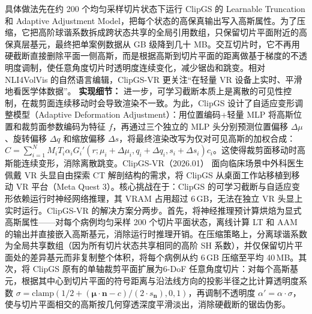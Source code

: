 具体做法先在约 200 个均匀采样切片状态下运行 ClipGS 的 Learnable Truncation 和 Adaptive Adjustment Model，把每个状态的高保真输出写入高斯属性。为了压缩，它把高阶球谐系数拆成跨状态共享的全局引用数组，只保留切片平面附近的高保真层基元，最终把单案例数据从 GB 级降到几十 MB。交互切片时，它不再用硬截断直接删除平面一侧高斯，而是根据高斯到切片平面的距离做基于梯度的不透明度调制，使任意角度切片时透明度连续变化，减少锯齿和跳变。相对 NLI4VolVis 的自然语言编辑，ClipGS-VR 更关注“在轻量 VR 设备上实时、平滑地看医学体数据”。
\textbf{实现细节：} 进一步，可学习截断本质上是离散的可见性控制，在裁剪面连续移动时会导致渲染不一致。为此，ClipGS 设计了自适应变形调整模型（Adaptive Deformation Adjustment）：用位置编码+轻量 MLP 将高斯位置和裁剪面参数编码为特征 $f$，再通过三个独立的 MLP 头分别预测位置偏移 $\Delta\mu$、旋转偏移 $\Delta q$ 和缩放偏移 $\Delta s$，将最终渲染改写为仅对可见高斯的加权合成：$C = \sum_{i=1}^{N} M_i T_i \alpha_i G_i'(r; \mu_i + \Delta\mu_i, q_i + \Delta q_i, s_i + \Delta s_i) c_i$。这使得裁剪面移动时高斯能连续变形，消除离散跳变。ClipGS-VR（2026.01） 面向临床场景中外科医生佩戴 VR 头显自由探索 CT 解剖结构的需求，将 ClipGS 从桌面工作站移植到移动 VR 平台（Meta Quest 3）。核心挑战在于：ClipGS 的可学习截断与自适应变形依赖运行时神经网络推理，其 VRAM 占用超过 6\,GB，无法在独立 VR 头显上实时运行。ClipGS-VR 的解决方案分两步。首先，将神经推理预计算烘焙为显式高斯属性——对每个病例均匀采样 200 个切片平面状态，离线计算 LT 和 AAM 的输出并直接嵌入高斯基元，消除运行时推理开销。在压缩策略上，分离球谐系数为全局共享数组（因为所有切片状态共享相同的高阶 SH 系数），并仅保留切片平面处的差异基元而非复制整个体积，将每个病例从约 6\,GB 压缩至平均 40\,MB。其次，将 ClipGS 原有的单轴裁剪平面扩展为6-DoF 任意角度切片：对每个高斯基元，根据其中心到切片平面的符号距离与沿法线方向的投影半径之比计算透明度系数 $\sigma = \mathrm{clamp}(1/2 + (\mathbf{\mu} \cdot \mathbf{n} - c)/(2 \cdot s_{\mathbf{n}}), 0, 1)$，再调制不透明度 $\alpha' = \alpha \cdot \sigma$，使与切片平面相交的高斯按几何穿透深度平滑淡出，消除硬截断的锯齿伪影。
